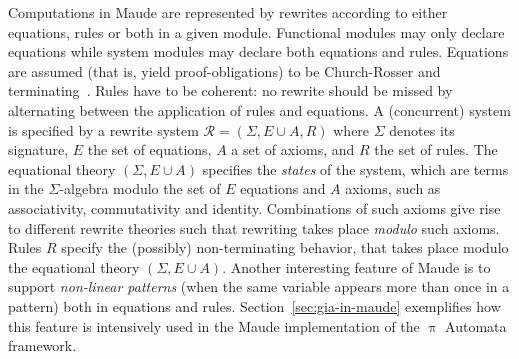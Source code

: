 \documentclass[a4paper,openany]{book}
\begin{document}
Computations in Maude are represented by rewrites according to either equations, rules or both in a given module. Functional modules may only declare equations while system modules may declare both equations and rules. Equations are assumed (that is, yield proof-obligations) to be Church-Rosser and terminating~\cite{Baader:1998:TR:280474}. Rules have to be coherent: no rewrite should be missed by alternating between the application of rules and equations. 
A (concurrent) system is specified by a rewrite system $\mathcal{R} = (\Sigma, E \cup A, R)$ where $\Sigma$ denotes its signature, $E$ the set of equations, $A$ a set of axioms, and $R$ the set of rules. The equational theory $(\Sigma, E \cup A)$ specifies the \emph{states} of the system, which are terms in the $\Sigma$-algebra modulo the set of $E$ equations and $A$ axioms, such as associativity, commutativity and identity. Combinations of such axioms give rise to different rewrite theories such that rewriting takes place \emph{modulo} such axioms. Rules $R$ specify the (possibly) non-terminating behavior, that takes place modulo the equational theory $(\Sigma, E \cup A)$. 
Another interesting feature of Maude is to support \emph{non-linear patterns} (when the same variable appears more than once in a pattern) both in equations and rules. Section~\ref{sec:gia-in-maude} exemplifies how this feature is intensively used in the Maude implementation of the $\uppi$ Automata framework.
\end{document}

